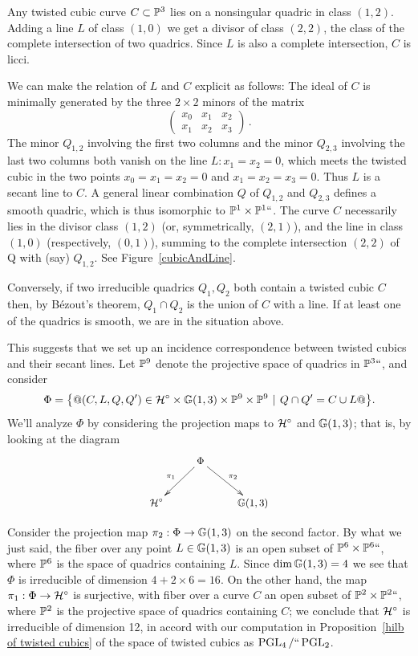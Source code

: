 Any twisted cubic curve $C\subset {\mathbb P}^{3}$ lies on a nonsingular quadric
in class $(1,2)$. Adding a line $L$ of class
$(1,0)$ we get a  divisor of class $(2,2)$, the class of the complete
intersection of two quadrics. Since $L$ is also
a complete intersection, $C$ is licci.

We can make the relation of $L$ and $C$ explicit as follows: The ideal
of $C$
is minimally generated by the three $2\times 2$ minors of the matrix
$$
\begin{pmatrix}
x_0&x_1&x_2\\
x_1&x_2&x_3
\end{pmatrix}\,.
$$
The minor $Q_{1,2}$ involving the first two columns and the minor
$Q_{2,3}$ involving the last two columns
both vanish on the line $L: x_1 = x_2 = 0$, which meets the twisted
cubic in the two points
$x_{0}= x_{1}=x_{2}=0$ and $x_{1} = x_{2} = x_{3}= 0$. Thus $L$ is a
secant line to $C$.
A general linear combination $Q$ of $Q_{1,2}$ and $Q_{2,3}$ defines
a smooth quadric, which is thus isomorphic to ${\mathbb P}^1\times {\mathbb P}^1`
`$. The curve $C$ necessarily lies in the divisor class $(1,2)$ (or,
symmetrically, $(2,1)$), and the line in class $(1,0)$ (respectively,
$(0,1)$), summing to the
%
complete intersection $(2,2)$ of Q with (say) $Q_{1,2}$. See
Figure~\ref{cubicAndLine}.

Conversely, if two irreducible quadrics $Q_{1}, Q_{2}$ both contain a
twisted cubic $C$ then, by
B\'ezout's theorem,
%
$Q_{1}\cap Q_{2}$ is the union of $C$ with a line. If at least one of
the quadrics is smooth, we are in the
situation above.

This suggests that we set up an incidence correspondence between twisted
cubics and their secant lines. Let ${\mathbb P}^9$ denote the projective space
of quadrics in ${\mathbb P}^3` `$, and consider
$$
\Phi = \bigl\{@ (C, L, Q, Q') \in \mathcal H^\circ \times {\mathbb G}(1,3) \times {\mathbb P}^9 \times
{\mathbb P}^9 \kern1pt \mid \kern1pt Q \cap Q' = C \cup L@ \bigr\}.
$$
We'll analyze $\Phi$ by considering the projection maps to $\mathcal H^\circ$
and ${\mathbb G}(1,3)$; that is, by looking at the diagram
$$\small\xymatrix{
 &  \Phi \ar[rd]^{\pi_2}\ar[ld]_{\pi_1} & \\
\cH^\circ & & \GG(1,3)
}
$$

Consider  the projection map $\pi_2 : \Phi \to {\mathbb G}(1,3)$ on the second
factor. By what we just said, the fiber over any point $L \in {\mathbb G}(1,3)$
is an open subset of ${\mathbb P}^6 \times {\mathbb P}^6` `$, where ${\mathbb P}^6$ is the space
of quadrics containing $L$. Since $\dim {\mathbb G}(1,3) = 4$ we see that $\Phi$
is irreducible of dimension $4 + 2\times 6 = 16$. On the other hand,
the map $\pi_1 : \Phi \to \mathcal H^\circ$ is surjective, with fiber over a
curve $C$ an open subset of ${\mathbb P}^2 \times {\mathbb P}^2` `$, where ${\mathbb P}^{2}$
is the projective space of quadrics containing $C$; we conclude that
$\mathcal H^\circ$ is irreducible of dimension 12, in accord with our
computation in Proposition~\ref{hilb of twisted cubics} of the space of
twisted cubics as
$\operatorname{PGL}_4/` `\operatorname{PGL}_2$.
%


